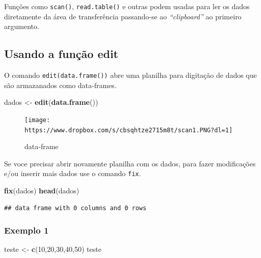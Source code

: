 \documentclass[
]{book}
\newenvironment{Shaded}{\begin{snugshade}}{\end{snugshade}}
\newcommand{\DecValTok}[1]{\textcolor[rgb]{0.00,0.00,0.81}{#1}}
\newcommand{\KeywordTok}[1]{\textcolor[rgb]{0.13,0.29,0.53}{\textbf{#1}}}
\newcommand{\NormalTok}[1]{#1}
\newcommand{\StringTok}[1]{\textcolor[rgb]{0.31,0.60,0.02}{#1}}
\begin{document}
Funções como \texttt{scan()}, \texttt{read.table()} e outras podem usadas para ler os dados diretamente da área de transferência passando-se ao \emph{``clipboard''} ao primeiro argumento.

\hypertarget{usando-a-funuxe7uxe3o-edit}{%
\subsection{Usando a função edit}\label{usando-a-funuxe7uxe3o-edit}}

O comando \texttt{edit(data.frame())} abre uma planilha para digitação de dados que são armazanados como data-frames.

\begin{Shaded}
\begin{Highlighting}[]
\NormalTok{dados <-}\StringTok{ }\KeywordTok{edit}\NormalTok{(}\KeywordTok{data.frame}\NormalTok{())}
\end{Highlighting}
\end{Shaded}

\begin{figure}
\centering
\texttt{[image: https://www.dropbox.com/s/cbsqhtze2715m8t/scan1.PNG?dl=1]}
\caption{data-frame}
\end{figure}

Se voce precisar abrir novamente planilha com os dados, para fazer modificações e/ou inserir mais dados use o comando \texttt{fix}.

\begin{Shaded}
\begin{Highlighting}[]
\KeywordTok{fix}\NormalTok{(dados)}
\KeywordTok{head}\NormalTok{(dados)}
\end{Highlighting}
\end{Shaded}

\begin{verbatim}
## data frame with 0 columns and 0 rows
\end{verbatim}

\hypertarget{exemplo-1}{%
\subsubsection{Exemplo 1}\label{exemplo-1}}

\begin{Shaded}
\begin{Highlighting}[]
\NormalTok{teste <-}\StringTok{ }\KeywordTok{c}\NormalTok{(}\DecValTok{10}\NormalTok{,}\DecValTok{20}\NormalTok{,}\DecValTok{30}\NormalTok{,}\DecValTok{40}\NormalTok{,}\DecValTok{50}\NormalTok{)}
\NormalTok{teste}
\end{Highlighting}
\end{Shaded}
\end{document}
